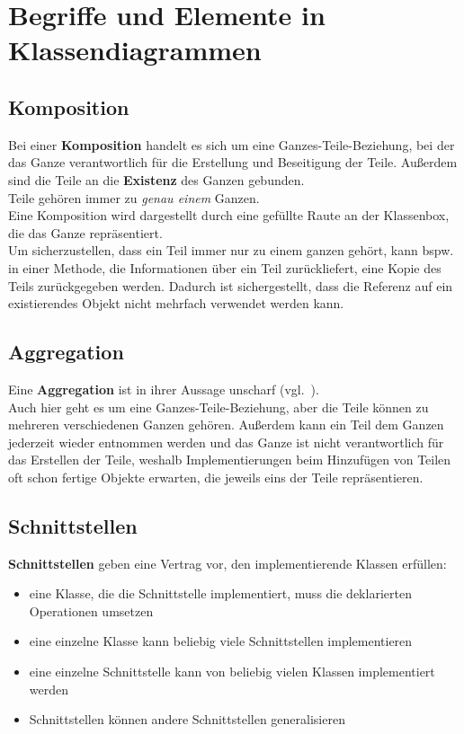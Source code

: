 \section{Begriffe und Elemente in Klassendiagrammen}

\subsection{Komposition}
Bei einer \textbf{Komposition} handelt es sich um eine Ganzes-Teile-Beziehung, bei der das Ganze verantwortlich für die Erstellung und Beseitigung der Teile.
Außerdem sind die Teile an die \textbf{Existenz} des Ganzen gebunden.\\
Teile gehören immer zu \textit{genau einem} Ganzen.\\
Eine Komposition wird dargestellt durch eine gefüllte Raute an der Klassenbox, die das Ganze repräsentiert.\\

\noindent
Um sicherzustellen, dass ein Teil immer nur zu einem ganzen gehört, kann bspw. in einer Methode, die Informationen über ein Teil zurückliefert, eine Kopie des Teils zurückgegeben werden.
Dadurch ist sichergestellt, dass die Referenz auf ein existierendes Objekt nicht mehrfach verwendet werden kann.

\subsection{Aggregation}
Eine \textbf{Aggregation} ist in ihrer \semantischen Aussage unscharf (vgl.~\cite[40]{Buh09}).\\
Auch hier geht es um eine Ganzes-Teile-Beziehung, aber die Teile können zu mehreren verschiedenen Ganzen gehören.
Außerdem kann ein Teil dem Ganzen jederzeit wieder entnommen werden und das Ganze ist nicht verantwortlich für das Erstellen der Teile, weshalb Implementierungen beim Hinzufügen von Teilen oft schon fertige Objekte erwarten, die jeweils eins der Teile repräsentieren.

\subsection{Schnittstellen}
\textbf{Schnittstellen} geben eine Vertrag vor, den implementierende Klassen erfüllen:

\begin{itemize}
    \item eine Klasse, die die Schnittstelle implementiert, muss die deklarierten Operationen umsetzen
    \item eine einzelne Klasse kann beliebig viele Schnittstellen implementieren
    \item eine einzelne Schnittstelle kann von beliebig vielen Klassen implementiert werden
    \item Schnittstellen können andere Schnittstellen generalisieren
\end{itemize}

